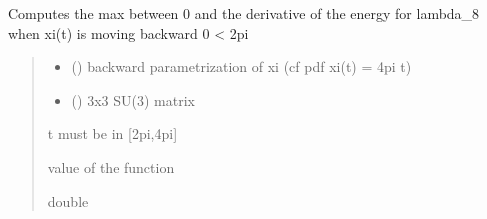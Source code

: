 \documentclass[letterpaper,10pt,english]{sphinxmanual}
\begin{document}
\begin{fulllineitems}
\label{\detokenize{numerical_reject:numerical_reject.derivee_f_lambda_8_plus_retour}}
\pysigstartsignatures
\pysiglinewithargsret
{}
{\sphinxparamcomma {}}
{}
\pysigstopsignatures
\sphinxAtStartPar
Computes the max between 0 and the derivative of the energy for lambda\_8 when xi(t) is moving backward 0 \textless{}\sphinxhyphen{} 2pi
\begin{quote}\begin{description}
\begin{itemize}
\item {} 
\sphinxAtStartPar
{} () \textendash{} backward parametrization of xi (cf pdf xi(t)  = 4pi \sphinxhyphen{} t)

\item {} 
\sphinxAtStartPar
{} () \textendash{} 3x3 SU(3) matrix

\end{itemize}

\sphinxAtStartPar
{} \textendash{} t must be in {[}2pi,4pi{]}

\sphinxAtStartPar
value of the function

\sphinxAtStartPar
double

\end{description}\end{quote}

\end{fulllineitems}

\end{document}
